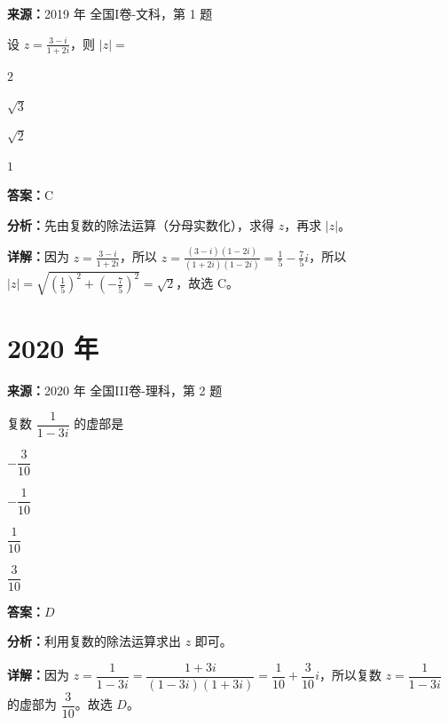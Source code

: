 \begin{question}[points=5]
\textbf{来源：}2019 年 全国I卷-文科，第 1 题\par
设 $z = \frac{3-i}{1+2i}$，则 $|z| =$
\begin{choices}
  \item $2$
  \item $\sqrt{3}$
  \item $\sqrt{2}$
  \item $1$
\end{choices}
\begin{solution}
\textbf{答案：}C

\textbf{分析：}先由复数的除法运算（分母实数化），求得 $z$，再求 $|z|$。

\textbf{详解：}因为 $z = \frac{3-i}{1+2i}$，所以 $z = \frac{(3-i)(1-2i)}{(1+2i)(1-2i)} = \frac{1}{5} - \frac{7}{5}i$，所以 $|z| = \sqrt{\left(\frac{1}{5}\right)^2 + \left(-\frac{7}{5}\right)^2} = \sqrt{2}$，故选 C。
\end{solution}
\end{question}

\section*{2020 年}

\begin{question}[points=5]
\textbf{来源：}2020 年 全国III卷-理科，第 2 题\par
复数 $\dfrac{1}{1-3i}$ 的虚部是
\begin{choices}
  \item $-\dfrac{3}{10}$
  \item $-\dfrac{1}{10}$
  \item $\dfrac{1}{10}$
  \item $\dfrac{3}{10}$
\end{choices}
\begin{solution}
\textbf{答案：}$D$

\textbf{分析：}利用复数的除法运算求出 $z$ 即可。

\textbf{详解：}因为 $z=\dfrac{1}{1-3i}=\dfrac{1+3i}{(1-3i)(1+3i)}=\dfrac{1}{10}+\dfrac{3}{10}i$，所以复数 $z=\dfrac{1}{1-3i}$ 的虚部为 $\dfrac{3}{10}$。故选 $D$。
\end{solution}
\end{question}

